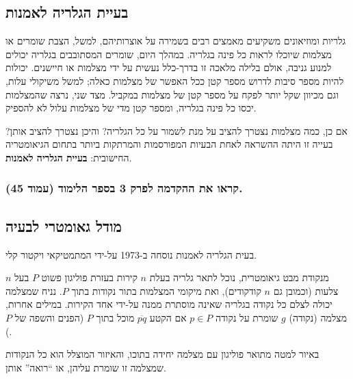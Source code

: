 \documentclass[
]{book}
\begin{document}
\hypertarget{agp}{%
\subsection{בעיית הגלריה לאמנות}\label{agp}}

גלריות ומוזיאונים משקיעים מאמצים רבים בשמירה על אוצרותיהם, למשל, הצבת שומרים או מצלמות שיוכלו לראות כל פינה בגלריה. במהלך היום, שומרים המסתובבים בגלריה יכולים למנוע גניבה, אולם בלילה מלאכה זו בדרך-כלל נעשית על ידי מצלמות או חיישנים. יכולות להיות מספר סיבות לדרוש מספר קטן ככל האפשר של מצלמות כאלה; למשל משיקולי עלות, וגם מכיוון שקל יותר לפקח על מספר קטן של מצלמות במקביל. מצד שני, נרצה שהמצלמות יכסו כל פינה בגלריה, ומספר קטן מדי של מצלמות עלול לא להספיק.

אם כן, כמה מצלמות נצטרך להציב על מנת לשמור על כל הגלריה? והיכן נצטרך להציב אותן? בעייה זו היתה ההשראה לאחת הבעיות המפורסמות והמרתקות ביותר בתחום הגיאומטריה החישובית: \textbf{בעיית הגלריה לאמנות}.

\hypertarget{ux5e7ux5e8ux5d0ux5d5-ux5d0ux5ea-ux5d4ux5d4ux5e7ux5d3ux5deux5d4-ux5dcux5e4ux5e8ux5e7-3-ux5d1ux5e1ux5e4ux5e8-ux5d4ux5dcux5d9ux5deux5d5ux5d3-ux5e2ux5deux5d5ux5d3-45.}{%
\subsubsection*{קראו את ההקדמה לפרק 3 בספר הלימוד (עמוד 45).}\label{ux5e7ux5e8ux5d0ux5d5-ux5d0ux5ea-ux5d4ux5d4ux5e7ux5d3ux5deux5d4-ux5dcux5e4ux5e8ux5e7-3-ux5d1ux5e1ux5e4ux5e8-ux5d4ux5dcux5d9ux5deux5d5ux5d3-ux5e2ux5deux5d5ux5d3-45.}}

\hypertarget{geom-model}{%
\subsection{מודל גאומטרי לבעיה}\label{geom-model}}

בעית הגלריה לאמנות נוסחה ב-1973 על-ידי המתמטיקאי ויקטור קלי.

מנקודת מבט גיאומטרית, נוכל לתאר גלריה בעלת \(n\) קירות בעזרת פוליגון פשוט \(P\) בעל \(n\) צלעות (וכמובן גם \(n\) קודקודים), ואת מיקומי המצלמות בתור נקודות בתוך \(P\). נניח שמצלמה יכולה לצלם כל נקודה בגלריה שאינה מוסתרת ממנה על-ידי אחד הקירות. במילים אחרות, מצלמה (נקודה) \(g\) שומרת על נקודה \(p\in P\) אם הקטע \(\overline{pq}\) מוכל בתוך \(P\) (הפנים והשפה של \(P\)).

באיור למטה מתואר פוליגון עם מצלמה יחידה בתוכו, והאיזור המוצלל הוא כל הנקודות שמצלמה זו שומרת עליהן, או ``רואה'' אותן.
\end{document}
